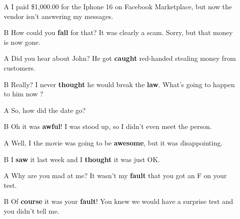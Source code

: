 \begin{itemize}
  \item[A] I paid \$1,000.00 for the Iphone 16 on Facebook Marketplace, but now the vendor isn't answering my messages.
  \item[B] How could you \textbf{fall} for that? It was clearly a scam. Sorry, but that money is now gone. 
\end{itemize}

\begin{itemize}
  \item[A] Did you hear about John? He got \textbf{caught} red-handed stealing money from customers.
  \item[B] Really? I never \textbf{thought} he would break the \textbf{law}. What's going to happen to him now ?  
\end{itemize}

\begin{itemize}
  \item[A] So, how did the date go?
  \item[B] Oh it was \textbf{awful}! I was stood up, so I didn't even meet the person.  
\end{itemize}

\begin{itemize}
  \item[A] Well, I  the movie was going to be \textbf{awesome}, but it was disappointing.
  \item[B] I \textbf{saw} it last week and I \textbf{thought} it was just OK. 
\end{itemize}

\begin{itemize}
  \item[A] Why are you mad at me? It wasn't my \textbf{fault} that you got an F on your test.
  \item[B] Of \textbf{course} it was your \textbf{fault}! You knew we would have a surprise test and you didn't tell me. 
\end{itemize}

\newpage






